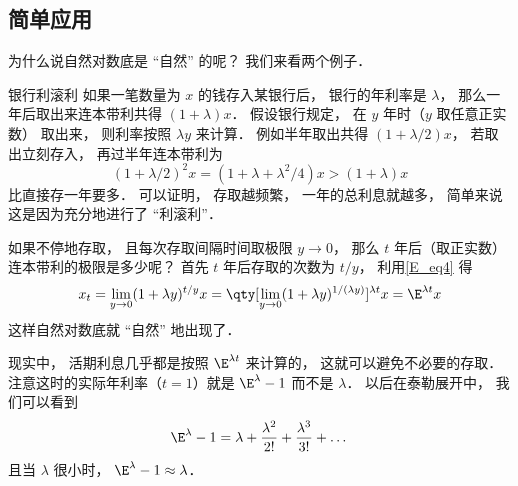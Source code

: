 \subsection{简单应用}
为什么说自然对数底是 “自然” 的呢？ 我们来看两个例子．

\begin{example}{银行利滚利}
如果一笔数量为 $x$ 的钱存入某银行后， 银行的年利率是 $\lambda$， 那么一年后取出来连本带利共得 $(1+\lambda)x$． 假设银行规定， 在 $y$ 年时（$y$ 取任意正实数） 取出来， 则利率按照 $\lambda y$ 来计算． 例如半年取出共得 $(1+\lambda/2)x$， 若取出立刻存入， 再过半年连本带利为
\begin{equation}
(1+\lambda/2)^2 x = (1 + \lambda + \lambda^2/4)x > (1 + \lambda) x
\end{equation}
比直接存一年要多． 可以证明， 存取越频繁， 一年的总利息就越多， 简单来说这是因为充分地进行了 “利滚利”．

如果不停地存取， 且每次存取间隔时间取极限 $y \to 0$， 那么 $t$ 年后（取正实数）连本带利的极限是多少呢？ 首先 $t$ 年后存取的次数为 $t/y$， 利用\autoref{E_eq4} 得
\begin{equation}
x_t = \lim_{y\to 0}(1 + \lambda y)^{t/y} x
= \qty[\lim_{y\to 0}(1 + \lambda y)^{1/(\lambda y)}]^{\lambda t} x
= \E^{\lambda t} x
\end{equation}
这样自然对数底就 “自然” 地出现了．

现实中， 活期利息几乎都是按照 $\E^{\lambda t}$ 来计算的， 这就可以避免不必要的存取． 注意这时的实际年利率（$t = 1$）就是 $\E^\lambda - 1$ 而不是 $\lambda$． 以后在泰勒展开中， 我们可以看到
\begin{equation}
\E^\lambda - 1 = \lambda + \frac{\lambda^2}{2!} + \frac{\lambda^3}{3!} + \dots
\end{equation}
且当 $\lambda$ 很小时， $\E^\lambda - 1 \approx \lambda$．
\end{example}

